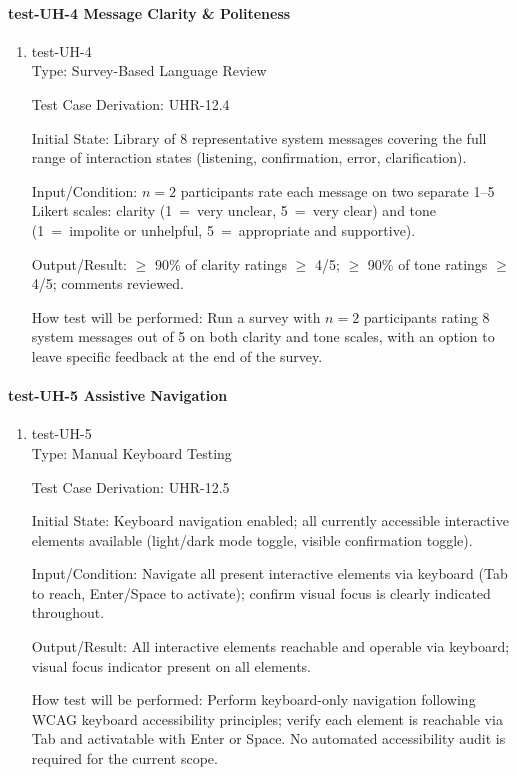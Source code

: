 \documentclass[12pt, titlepage]{article}
\begin{document}
\paragraph{test-UH-4 Message Clarity \& Politeness}

\begin{enumerate}
\item{test-UH-4\\}
Type: Survey-Based Language Review

Test Case Derivation: UHR-12.4

Initial State: Library of 8 representative system messages covering the full range of interaction states (listening, confirmation, error, clarification).

Input/Condition: $n=2$ participants rate each message on two separate 1--5 Likert scales: clarity (1~=~very unclear, 5~=~very clear) and tone (1~=~impolite or unhelpful, 5~=~appropriate and supportive).

Output/Result: $\geq$ 90\% of clarity ratings $\geq$ 4/5; $\geq$ 90\% of tone ratings $\geq$ 4/5; comments reviewed.

How test will be performed: Run a survey with $n=2$ participants rating 8 system messages out of 5 on both clarity and tone scales, with an option to leave specific feedback at the end of the survey.
\end{enumerate}

\paragraph{test-UH-5 Assistive Navigation}

\begin{enumerate}
\item{test-UH-5\\}
Type: Manual Keyboard Testing

Test Case Derivation: UHR-12.5

Initial State: Keyboard navigation enabled; all currently accessible interactive elements available (light/dark mode toggle, visible confirmation toggle).

Input/Condition: Navigate all present interactive elements via keyboard (Tab to reach, Enter/Space to activate); confirm visual focus is clearly indicated throughout.

Output/Result: All interactive elements reachable and operable via keyboard; visual focus indicator present on all elements.

How test will be performed: Perform keyboard-only navigation following WCAG keyboard accessibility principles; verify each element is reachable via Tab and activatable with Enter or Space. No automated accessibility audit is required for the current scope.
\end{enumerate}
\end{document}
